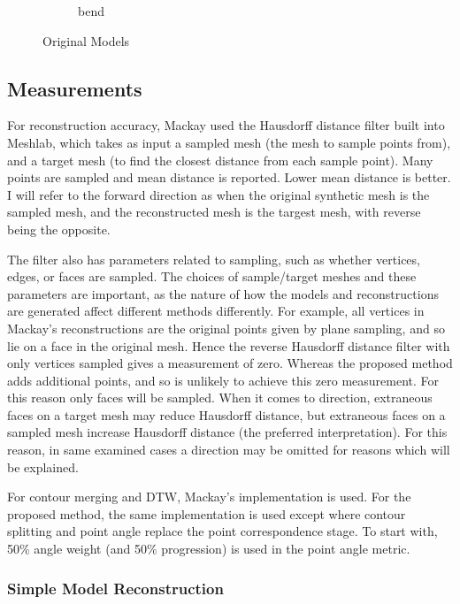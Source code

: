 \documentclass[11p, titlepage]{article}
\begin{document}
\begin{figure}[h]
\begin{subfigure}[b]{0.3\textwidth}
         \caption{bend}
         \label{fig:bend}
     \end{subfigure}
        \caption{Original Models}
        \label{fig:original_models}
\end{figure}

\subsection{Measurements}

For reconstruction accuracy, Mackay used the Hausdorff distance filter built into Meshlab, which takes as input a sampled mesh (the mesh to sample points from), and a target mesh (to find the closest distance from each sample point). Many points are sampled and mean distance is reported. Lower mean distance is better. I will refer to the forward direction as when the original synthetic mesh is the sampled mesh, and the reconstructed mesh is the targest mesh, with reverse being the opposite. 

The filter also has parameters related to sampling, such as whether vertices, edges, or faces are sampled. The choices of sample/target meshes and these parameters are important, as the nature of how the models and reconstructions are generated affect different methods differently. For example, all vertices in Mackay's reconstructions are the original points given by plane sampling, and so lie on a face in the original mesh. Hence the reverse Hausdorff distance filter with only vertices sampled gives a measurement of zero. Whereas the proposed method adds additional points, and so is unlikely to achieve this zero measurement. For this reason only faces will be sampled. When it comes to direction, extraneous faces on a target mesh may reduce Hausdorff distance, but extraneous faces on a sampled mesh increase Hausdorff distance (the preferred interpretation). For this reason, in same examined cases a direction may be omitted for reasons which will be explained.

For contour merging and DTW, Mackay's implementation is used. For the proposed method, the same implementation is used except where contour splitting and point angle replace the point correspondence stage. To start with, 50\% angle weight (and 50\% progression) is used in the point angle metric.

\subsubsection{Simple Model Reconstruction}
\end{document}
